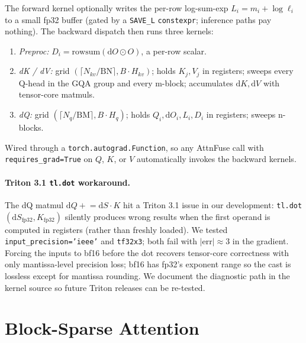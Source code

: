 \documentclass[10pt,twocolumn]{article}
\begin{document}
The forward kernel optionally writes the per-row log-sum-exp
$L_i = m_i + \log \ell_i$ to a small fp32 buffer (gated by a
\texttt{SAVE\_L} \texttt{constexpr}; inference paths pay nothing).
The backward dispatch then runs three kernels:

\begin{enumerate}[leftmargin=1.3em,itemsep=1pt]
  \item \emph{Preproc:} $D_i = \mathrm{rowsum}(\mathrm{d}O \odot O)$,
        a per-row scalar.
  \item \emph{dK / dV:} grid $(\lceil N_{kv} / \text{BN} \rceil, B \cdot H_{kv})$;
        holds $K_j, V_j$ in registers; sweeps every Q-head in the GQA group
        and every m-block; accumulates $\mathrm{d}K, \mathrm{d}V$
        with tensor-core matmuls.
  \item \emph{dQ:} grid $(\lceil N_q / \text{BM} \rceil, B \cdot H_q)$;
        holds $Q_i, \mathrm{d}O_i, L_i, D_i$ in registers; sweeps n-blocks.
\end{enumerate}

Wired through a \texttt{torch.autograd.Function}, so any AttnFuse call
with \texttt{requires\_grad=True} on $Q$, $K$, or $V$ automatically
invokes the backward kernels.

\paragraph{Triton 3.1 \texttt{tl.dot} workaround.}
The dQ matmul $\mathrm{d}Q \mathrel{+}= \mathrm{d}S \cdot K$ hit a
Triton 3.1 issue in our development:
\texttt{tl.dot}$(\mathrm{d}S_{\text{fp32}}, K_{\text{fp32}})$ silently
produces wrong results when the first operand is computed in registers
(rather than freshly loaded). We tested
\texttt{input\_precision='ieee'} and \texttt{tf32x3}; both fail with
$|\mathrm{err}| \approx 3$ in the gradient. Forcing the inputs to bf16
before the dot recovers tensor-core correctness with only
mantissa-level precision loss; bf16 has fp32's exponent range so the
cast is lossless except for mantissa rounding. We document the
diagnostic path in the kernel source so future Triton releases can be
re-tested.

\section{Block-Sparse Attention}
\label{sec:blocksparse}
\end{document}
